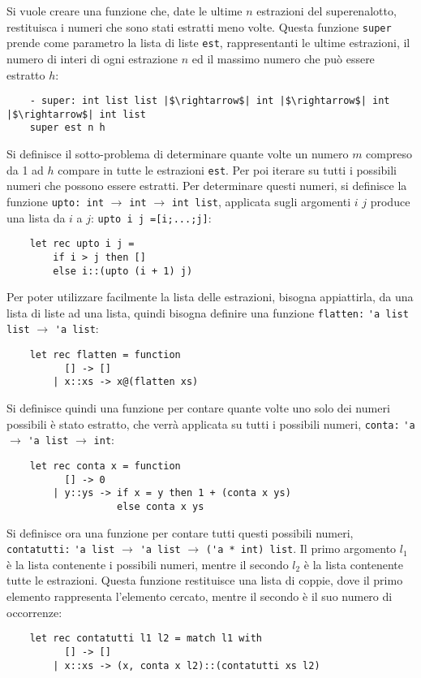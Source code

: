 \documentclass{article}
\numberwithin{equation}{subsection}
\begin{document}
Si vuole creare una funzione che, date le ultime $n$ estrazioni del superenalotto, restituisca i numeri che sono stati estratti meno volte. Questa funzione \verb|super| prende come parametro la lista di liste \verb|est|, rappresentanti le ultime estrazioni, il numero di interi di ogni estrazione $n$ ed il massimo numero che può essere estratto $h$:
\begin{verbatim}
    - super: int list list |$\rightarrow$| int |$\rightarrow$| int |$\rightarrow$| int list
    super est n h
\end{verbatim}
Si definisce il sotto-problema di determinare quante volte un numero $m$ compreso da 1 ad $h$ compare in tutte le estrazioni \verb|est|. Per poi iterare su tutti i possibili numeri che possono essere estratti. 
Per determinare questi numeri, si definisce la funzione \verb|upto: int| $\rightarrow$ \verb|int| $\rightarrow$ \verb|int list|, applicata sugli argomenti $i$ $j$ produce una lista da $i$ a $j$: \verb|upto i j =[i;...;j]|:
\begin{verbatim}
    let rec upto i j =
        if i > j then []
        else i::(upto (i + 1) j)    
\end{verbatim}

Per poter utilizzare facilmente la lista delle estrazioni, bisogna appiattirla, da una lista di liste ad una lista, quindi bisogna definire una funzione \verb|flatten:| \verb|'a list list| $\rightarrow$ \verb|'a list|:
\begin{verbatim}
    let rec flatten = function
          [] -> []
        | x::xs -> x@(flatten xs)
\end{verbatim}

Si definisce quindi una funzione per contare quante volte uno solo dei numeri possibili è stato estratto, che verrà applicata su tutti i possibili numeri, \verb|conta:| \verb|'a| $\rightarrow$ \verb|'a list| $\rightarrow$ \verb|int|:
\begin{verbatim}
    let rec conta x = function
          [] -> 0
        | y::ys -> if x = y then 1 + (conta x ys)
                   else conta x ys
\end{verbatim}

Si definisce ora una funzione per contare tutti questi possibili numeri, \verb|contatutti:| \verb|'a list| $\rightarrow$ \verb|'a list| $\rightarrow$ \verb|('a * int) list|. Il primo argomento $l_1$ è la lista contenente i possibili numeri, mentre il secondo $l_2$ è la lista contenente tutte le estrazioni. 
Questa funzione restituisce una lista di coppie, dove il primo elemento rappresenta l'elemento cercato, mentre il secondo è il suo numero di occorrenze:
\begin{verbatim}
    let rec contatutti l1 l2 = match l1 with
          [] -> []
        | x::xs -> (x, conta x l2)::(contatutti xs l2)    
\end{verbatim}
\end{document}
